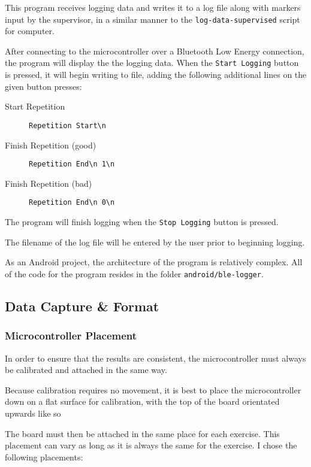 \documentclass[a4paper]{article}
\begin{document}
This program receives logging data and writes it to a log file along with markers input by the supervisor, in a similar manner to the \lstinline{log-data-supervised} script for computer.

After connecting to the microcontroller over a Bluetooth Low Energy connection, the program will display the the logging data. When the \lstinline{Start Logging} button is pressed, it will begin writing to file, adding the following additional lines on the given button presses:

\begin{description}
\item[Start Repetition] \lstinline|Repetition Start\n|
\item[Finish Repetition (good)] \lstinline|Repetition End\n 1\n|
\item[Finish Repetition (bad)] \lstinline|Repetition End\n 0\n|
\end{description}

The program will finish logging when the \lstinline{Stop Logging} button is pressed.

The filename of the log file will be entered by the user prior to beginning logging.

As an Android project, the architecture of the program is relatively complex. All of the code for the program resides in the folder \lstinline{android/ble-logger}. 


\subsection{Data Capture \& Format}%

\subsubsection{Microcontroller Placement}

In order to ensure that the results are consistent, the microcontroller must always be calibrated and attached in the same way.

Because calibration requires no movement, it is best to place the microcontroller down on a flat surface for calibration, with the top of the board orientated upwards like so


The board must then be attached in the same place for each exercise. This placement can vary as long as it is always the same for the exercise. I chose the following placements:
\end{document}
